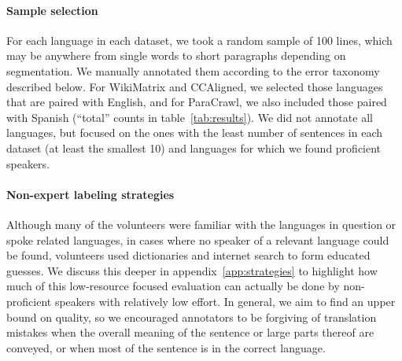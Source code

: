 \paragraph{Sample selection} For each language in each dataset, we took a random sample of 100 lines, which may be anywhere from single words to short paragraphs depending on segmentation.%
We manually annotated them according to the error taxonomy described below. For WikiMatrix and CCAligned, we selected those languages that are paired with English, and for ParaCrawl, we also included those paired with Spanish (``total'' counts in table~\ref{tab:results}).
We did not annotate all languages, but focused on the ones with the least number of sentences in each dataset (at least the smallest 10) and languages for which we found proficient speakers.


\paragraph{Non-expert labeling strategies}
Although many of the volunteers were familiar with the languages in question or spoke related languages, in cases where no speaker of a relevant language could be found, volunteers used dictionaries and internet search to form educated guesses. We discuss this deeper in  appendix~\ref{app:strategies} to highlight how much of this low-resource focused evaluation can actually be done by non-proficient speakers with relatively low effort.
In general, we aim to find an upper bound on quality, so we encouraged annotators to be forgiving of translation mistakes when the overall meaning of the sentence or large parts thereof are conveyed, or when most of the sentence is in the correct language.

